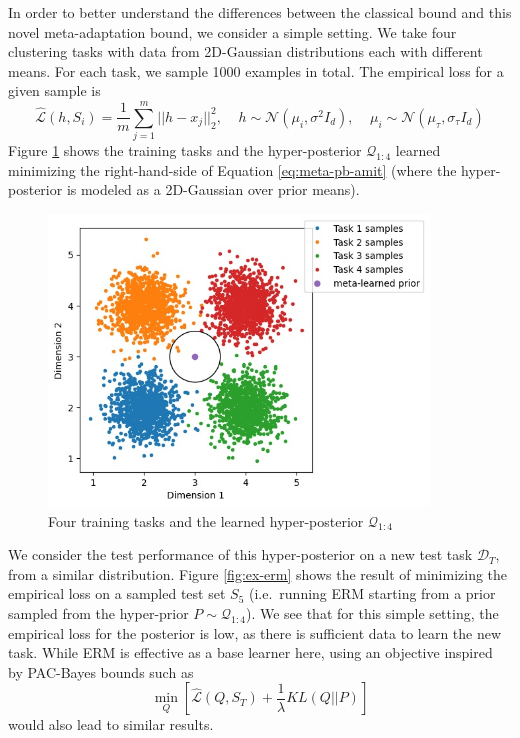 \documentclass{article}
\theoremstyle{definition}
\begin{document}
In order to better understand the differences between the classical bound and this novel meta-adaptation bound, we consider a simple setting. We take four clustering tasks with data from 2D-Gaussian distributions each with different means. 
For each task, we sample 1000 examples in total.
The empirical loss for a given sample is $$\hat{\mathcal{L}}(h,S_i)=\frac{1}{m}\sum_{j=1}^{m}||h-x_j||_2^2, \;\;\;\; h\sim \mathcal{N}(\mu_i,\sigma^2 I_d), \;\;\;\; \mu_i\sim \mathcal{N}(\mu_\tau,\sigma_\tau I_d)$$
Figure \ref{fig:ex-baseline} shows the training tasks and the hyper-posterior $\mathcal{Q}_{1:4}$ learned minimizing the right-hand-side of Equation \ref{eq:meta-pb-amit} (where the hyper-posterior is modeled as a 2D-Gaussian over prior means).

\begin{figure}
	\centering
	\includegraphics[width=0.9\textwidth]{toy_example_train.JPG}
	\caption{Four training tasks and the learned hyper-posterior $\mathcal{Q}_{1:4}$}
	\label{fig:ex-baseline}
\end{figure}

We consider the test performance of this hyper-posterior on a new test task $\mathcal{D}_T$, from a similar distribution.
 Figure \ref{fig:ex-erm} shows the result of minimizing the empirical loss on a sampled test set $S_5$ (i.e.\ running ERM starting from a prior sampled from the hyper-prior $P\sim \mathcal{Q}_{1:4}$). We see that for this simple setting, the empirical loss for the posterior is low, as there is sufficient data to learn the new task.
While ERM is effective as a base learner here, using an objective inspired by PAC-Bayes bounds such as $$\min_{Q}\left [\hat{\mathcal{L}}(Q, S_T) + \frac{1}{\lambda}KL(Q||P)\right ]$$ would also lead to similar results. 
\end{document}
